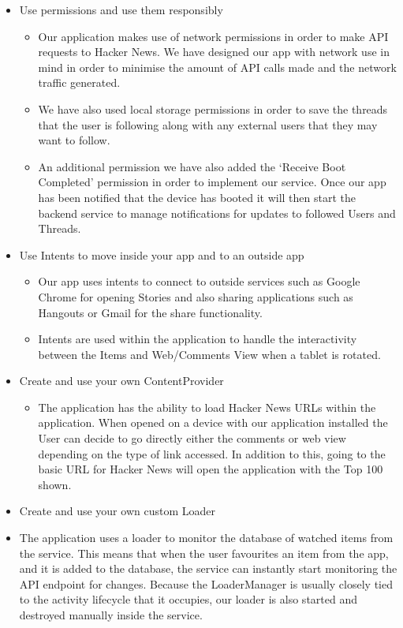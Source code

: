 \documentclass[11pt]{article}
\begin{document}
\begin{itemize}
\begin{itemize}
\begin{center}
			\end{center}
	\end{itemize}
	\item{Use permissions and use them responsibly}
	\begin{itemize}
		\item{Our application makes use of network permissions in order to make API requests to Hacker News. We have designed our app with network use in mind in order to minimise the amount of API calls made and the network traffic generated.}
		\item{We have also used local storage permissions in order to save the threads that the user is following along with any external users that they may want to follow.}
		\item{An additional permission we have also added the ‘Receive Boot Completed' permission in order to implement our service. Once our app has been notified that the device has booted it will then start the backend service to manage notifications for updates to followed Users and Threads.}
	\end{itemize}
	\item{Use Intents to move inside your app and to an outside app}
	\begin{itemize}
		\item{Our app uses intents to connect to outside services such as Google Chrome for opening Stories and also sharing applications such as Hangouts or Gmail for the share functionality.}
		\item{Intents are used within the application to handle the interactivity between the Items and Web/Comments View when a tablet is rotated.}
	\end{itemize}
	\item{Create and use your own ContentProvider}
	\begin{itemize}
		\item{The application has the ability to load Hacker News URLs within the application. When opened on a device with our application installed the User can decide to go directly either the comments or web view depending on the type of link accessed. In addition to this, going to the basic URL for Hacker News will open the application with the Top 100 shown.}
	\end{itemize}
	\item{Create and use your own custom Loader}
	\item{The application uses a loader to monitor the database of watched items from the service. This means that when the user favourites an item from the app, and it is added to the database, the service can instantly start monitoring the API endpoint for changes. Because the LoaderManager is usually closely tied to the activity lifecycle that it occupies, our loader is also started and destroyed manually inside the service.}

\end{itemize}
\end{document}
